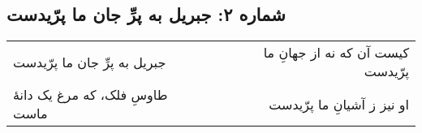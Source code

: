 \begin{center}
\section*{شماره ۲: جبریل به پرِّ جان ما پرّیدست}
\label{sec:002}
\begin{longtable}{l p{0.5cm} r}
جبریل به پرِّ جان ما پرّیدست
&&
کیست آن که نه از جهانِ ما پرّیدست
\\
طاوسِ فلک، که مرغ یک دانهٔ‌ ماست
&&
او نیز ز آشیانِ ما پرّیدست
\\
\end{longtable}
\end{center}
